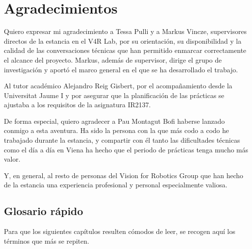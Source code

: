 \documentclass[11pt,fleqn,openany]{book} %
\begin{document}
\section{Agradecimientos}

Quiero expresar mi agradecimiento a Tessa Pulli y a Markus Vincze, supervisores directos de la estancia en el V4R Lab, por su orientación, su disponibilidad y la calidad de las conversaciones técnicas que han permitido enmarcar correctamente el alcance del proyecto. Markus, además de supervisor, dirige el grupo de investigación y aportó el marco general en el que se ha desarrollado el trabajo.

Al tutor académico Alejandro Reig Gisbert, por el acompañamiento desde la Universitat Jaume I y por asegurar que la planificación de las prácticas se ajustaba a los requisitos de la asignatura IR2137.

De forma especial, quiero agradecer a Pau Montagut Bofi haberse lanzado conmigo a esta aventura. Ha sido la persona con la que más codo a codo he trabajado durante la estancia, y compartir con él tanto las dificultades técnicas como el día a día en Viena ha hecho que el periodo de prácticas tenga mucho más valor.

Y, en general, al resto de personas del Vision for Robotics Group que han hecho de la estancia una experiencia profesional y personal especialmente valiosa.

\medskip

\subsection*{Glosario rápido}

Para que los siguientes capítulos resulten cómodos de leer, se recogen aquí los términos que más se repiten.
\end{document}
